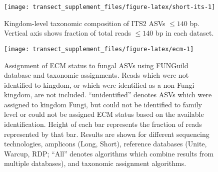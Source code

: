 \documentclass[
]{article}
\begin{document}
\begin{figure}

{\centering \texttt{[image: transect\_supplement\_files/figure-latex/short-its-1]} 

}

\caption[Kingdom-level taxonomic composition of ITS2 ASVs \(\le 140\) bp]{Kingdom-level taxonomic composition of ITS2 ASVs \(\le 140\) bp. Vertical axis shows fraction of total reads \(\le 140\) bp in each dataset.}\label{fig:short-its}
\end{figure}








\begin{figure}

{\centering \texttt{[image: transect\_supplement\_files/figure-latex/ecm-1]} 

}

\caption[Assignment of ECM status to fungal ASVs using FUNGuild database and taxonomic assignments]{Assignment of ECM status to fungal ASVs using FUNGuild database and taxonomic assignments. Reads which were not identified to kingdom, or which were identified as a non-Fungi kingdom, are not included.
``unidentified'' denotes ASVs which were assigned to kingdom Fungi, but could not be identified to family level or could not be assigned ECM status based on the available identification.
Height of each bar represents the fraction of reads represented by that bar.
Results are shown for different sequencing technologies, amplicons (Long, Short), reference databases (Unite, Warcup, RDP; ``All'' denotes algorithms which combine results from multiple databases), and taxonomic assignment algorithms.}\label{fig:ecm}
\end{figure}
\end{document}
